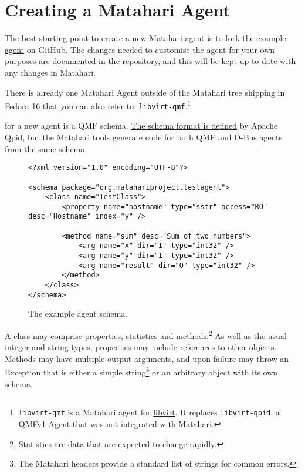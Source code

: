 \section{Creating a Matahari Agent}

The best starting point to create a new Matahari agent is to fork the \href{https://github.com/matahari/matahari-agent-example}{example agent} on GitHub. The changes needed to customise the agent for your own purposes are documented in the repository, and this will be kept up to date with any changes in Matahari.

There is already one Matahari Agent outside of the Matahari tree shipping in Fedora 16 that you can also refer to: \href{https://github.com/matahari/libvirt-qmf}{\texttt{libvirt-qmf}}.\footnote{\texttt{libvirt-qmf} is a Matahari agent for \href{http://libvirt.org}{libvirt}. It replaces \texttt{libvirt-qpid}, a QMFv1 Agent that was not integrated with Matahari.}

 for a new agent is a QMF schema. \href{https://cwiki.apache.org/qpid/qpid-management-framework.html#QpidManagementFramework-Schema}{The schema format is defined} by Apache Qpid, but the Matahari tools generate code for both QMF and D-Bus agents from the same schema.

\begin{figure}[h]
\begin{Verbatim}
<?xml version="1.0" encoding="UTF-8"?>

<schema package="org.matahariproject.testagent">
    <class name="TestClass">
        <property name="hostname" type="sstr" access="RO" desc="Hostname" index="y" />

        <method name="sum" desc="Sum of two numbers">
            <arg name="x" dir="I" type="int32" />
            <arg name="y" dir="I" type="int32" />
            <arg name="result" dir="O" type="int32" />
        </method>
    </class>
</schema>
\end{Verbatim}
\caption{The example agent schema.}
\label{fig:schema}
\end{figure}

A class may comprise properties, statistics and methods.\footnote{Statistics are data that are expected to change rapidly.} As well as the usual integer and string types, properties may include references to other objects.
Methods may have multiple output arguments, and upon failure may throw an Exception that is either a simple string\footnote{The Matahari headers provide a standard list of strings for common errors.} or an arbitrary object with its own schema.

